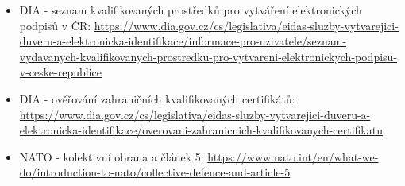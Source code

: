 \documentclass[11pt,a4paper]{article}
\begin{document}
\begin{itemize}
  \item DIA - seznam kvalifikovaných prostředků pro vytváření elektronických podpisů v ČR: \url{https://www.dia.gov.cz/cs/legislativa/eidas-sluzby-vytvarejici-duveru-a-elektronicka-identifikace/informace-pro-uzivatele/seznam-vydavanych-kvalifikovanych-prostredku-pro-vytvareni-elektronickych-podpisu-v-ceske-republice}
  \item DIA - ověřování zahraničních kvalifikovaných certifikátů: \url{https://www.dia.gov.cz/cs/legislativa/eidas-sluzby-vytvarejici-duveru-a-elektronicka-identifikace/overovani-zahranicnich-kvalifikovanych-certifikatu}
  \item NATO - kolektivní obrana a článek 5: \url{https://www.nato.int/en/what-we-do/introduction-to-nato/collective-defence-and-article-5}
\end{itemize}
\end{document}
